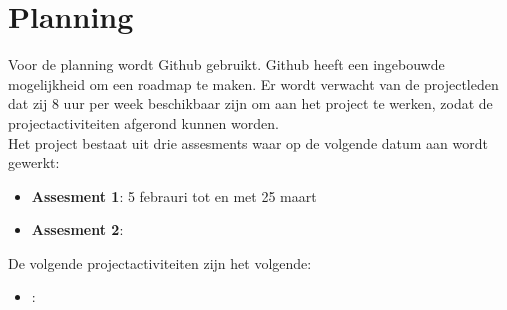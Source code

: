 \section{Planning}

Voor de planning wordt Github gebruikt. Github heeft een ingebouwde mogelijkheid om een roadmap te maken. Er wordt verwacht van de projectleden dat zij 8 uur per week beschikbaar zijn om aan het project te werken, zodat de projectactiviteiten afgerond kunnen worden. \\
Het project bestaat uit drie assesments waar op de volgende datum aan wordt gewerkt:
\begin{itemize}
  \item \textbf{Assesment 1}: 5 febrauri tot en met 25 maart
  \item \textbf{Assesment 2}:

\end{itemize}

De volgende projectactiviteiten zijn het volgende:
\begin{itemize}
  \item \textbf{}:

\end{itemize}



